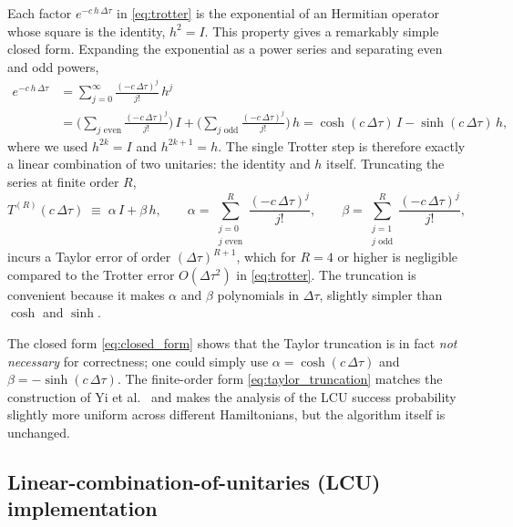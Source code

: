 Each factor $e^{-c\,h\,\Delta\tau}$ in \cref{eq:trotter} is the
exponential of an Hermitian operator whose square is the identity,
$h^{2} = I$. This property gives a remarkably simple closed form.
Expanding the exponential as a power series and separating even and odd
powers,
\begin{align}
  \label{eq:taylor_series}
  e^{-c\,h\,\Delta\tau}
  &= \sum_{j=0}^{\infty} \frac{(-c\,\Delta\tau)^{j}}{j!}\,h^{j}\\
  &= \biggl(\sum_{j\text{ even}} \frac{(-c\,\Delta\tau)^{j}}{j!}\biggr)\,I
   + \biggl(\sum_{j\text{ odd}}  \frac{(-c\,\Delta\tau)^{j}}{j!}\biggr)\,h
   = \cosh(c\,\Delta\tau)\,I - \sinh(c\,\Delta\tau)\,h,
  \label{eq:closed_form}
\end{align}
where we used $h^{2k} = I$ and $h^{2k+1} = h$. The single Trotter step
is therefore exactly a linear combination of two unitaries: the identity
and $h$ itself. Truncating the series at finite order $R$,
\begin{equation}
  \label{eq:taylor_truncation}
  T^{(R)}(c\,\Delta\tau)
  \;\equiv\; \alpha\,I + \beta\,h,
  \qquad
  \alpha = \sum_{\substack{j=0\\j\text{ even}}}^{R}\!\frac{(-c\,\Delta\tau)^{j}}{j!},
  \qquad
  \beta  = \sum_{\substack{j=1\\j\text{ odd}}}^{R}\!\frac{(-c\,\Delta\tau)^{j}}{j!},
\end{equation}
incurs a Taylor error of order $(\Delta\tau)^{R+1}$, which for
$R = 4$ or higher is negligible compared to the Trotter error
$O(\Delta\tau^{2})$ in \cref{eq:trotter}. The truncation is convenient
because it makes $\alpha$ and $\beta$ polynomials in $\Delta\tau$,
slightly simpler than $\cosh$ and $\sinh$.

\begin{remark}
The closed form \cref{eq:closed_form} shows that the Taylor truncation
is in fact \emph{not necessary} for correctness; one could simply use
$\alpha = \cosh(c\,\Delta\tau)$ and $\beta = -\sinh(c\,\Delta\tau)$. The
finite-order form \cref{eq:taylor_truncation} matches the construction
of Yi et al.~\cite{yi2025} and makes the analysis of the LCU success
probability slightly more uniform across different Hamiltonians, but the
algorithm itself is unchanged.
\end{remark}

\subsection{Linear-combination-of-unitaries (LCU) implementation}
\label{ssec:lcu}

